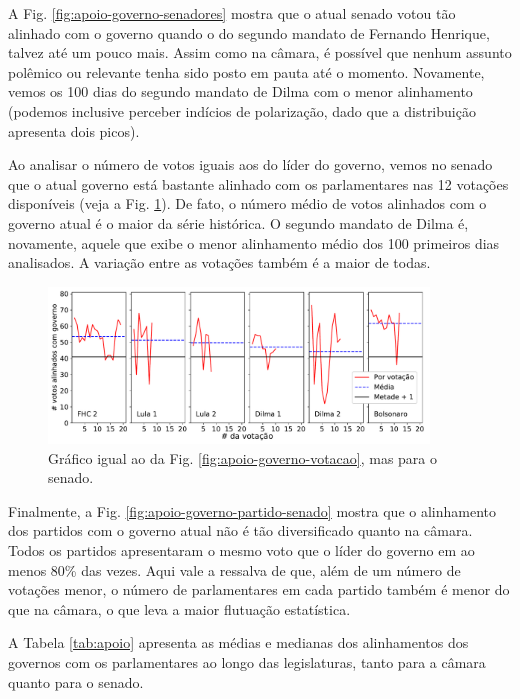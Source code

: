 \documentclass[12pt,a4paper]{article}
\begin{document}
 A Fig. \ref{fig:apoio-governo-senadores} mostra que o atual senado votou tão alinhado com o governo quando o do segundo mandato de Fernando Henrique, talvez até um pouco mais. Assim como na câmara, é possível que nenhum assunto polêmico ou relevante tenha sido posto em pauta até o momento. Novamente, vemos os 100 dias do segundo mandato de Dilma com o menor alinhamento (podemos inclusive perceber indícios de polarização, dado que a distribuição apresenta dois picos).

Ao analisar o número de votos iguais aos do líder do governo, vemos no senado que o atual governo está bastante alinhado com os parlamentares nas 12 votações disponíveis (veja a Fig. \ref{fig:apoio-governo-votacao-senado}). De fato, o número médio de votos alinhados com o governo atual é o maior da série histórica. O segundo mandato de Dilma é, novamente, aquele que exibe o menor alinhamento médio dos 100 primeiros dias analisados. A variação entre as votações também é a maior de todas.

\begin{figure}[H]
\centering
\includegraphics[width=0.9\textwidth]{graficos/senado/apoio_senado_ao_governo_por_votacao_2019-05-08.pdf}
\caption{Gráfico igual ao da Fig. \ref{fig:apoio-governo-votacao}, mas para o senado.}
\label{fig:apoio-governo-votacao-senado}
\end{figure} 

Finalmente, a Fig. \ref{fig:apoio-governo-partido-senado} mostra que o alinhamento dos partidos com o governo atual não é tão diversificado quanto na câmara. Todos os partidos apresentaram o mesmo voto que o líder do governo em ao menos 80\% 
das vezes. Aqui vale a ressalva de que, além de um número de votações menor, o número de parlamentares em cada partido também é menor do que na câmara, o que leva a maior flutuação estatística. 

A Tabela \ref{tab:apoio} apresenta as médias e medianas dos alinhamentos dos governos com os parlamentares ao longo das legislaturas, tanto para a câmara quanto para o senado.
\end{document}
